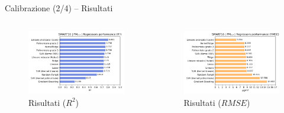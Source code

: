 \begin{frame}{Calibrazione (2/4)  – Risultati}
\begin{columns}

\begin{column}{0.55\textwidth}

\begin{center}
\begin{figure}[H]
\centering
\captionsetup{justification=centering}
\includegraphics[width=\textwidth]{images/hist_pm2.5_1.png}
\caption{Risultati  ($R^2$)}
\end{figure}
\end{center}

\end{column}
\begin{column}{0.55\textwidth}

\begin{center}
\begin{figure}[H]
\centering
\captionsetup{justification=centering}
\includegraphics[width=\textwidth]{images/hist_pm2.5_2.png}
\caption{Risultati  ($RMSE$)}
\end{figure}
\end{center}

\end{column}
  
\end{columns}

\end{frame}


